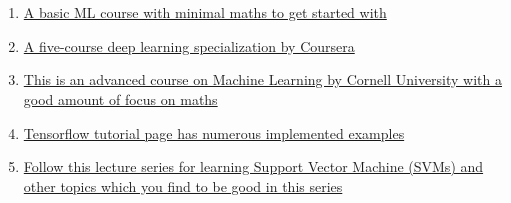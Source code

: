 \documentclass[12 pt]{report}
\begin{document}
    \section*{}
    \begin{enumerate}
        \item \href{https://www.coursera.org/learn/machine-learning#syllabus}{A basic ML course with minimal maths to get started with}
        \item \href{https://www.coursera.org/specializations/deep-learning#courses}{A five-course deep learning specialization by Coursera}
        \item \href{https://youtube.com/playlist?list=PLl8OlHZGYOQ7bkVbuRthEsaLr7bONzbXS}{This is an advanced course on Machine Learning by Cornell University with a good amount of focus on maths}
        \item \href{https://www.tensorflow.org/tutorials}{Tensorflow tutorial page has numerous implemented examples}
        \item \href{https://www.youtube.com/watch?v=_PwhiWxHK8o}{Follow this lecture series for learning Support Vector Machine (SVMs) and other topics which you find to be good in this series}
    \end{enumerate}
\end{document}
